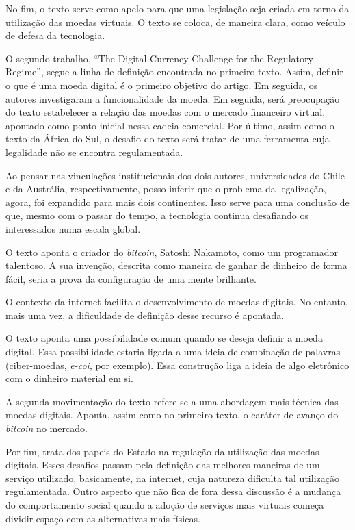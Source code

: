 \documentclass[12pt]{article}
\begin{document}
No fim, o texto serve como apelo para que uma legislação seja criada em torno da utilização das moedas virtuais. O texto se coloca, de maneira clara, como veículo de defesa da tecnologia.

O segundo trabalho, “The Digital Currency Challenge for the Regulatory Regime”, segue a linha de definição encontrada no primeiro texto. Assim, definir o que é uma moeda digital é o primeiro objetivo do artigo. Em seguida, os autores investigaram a funcionalidade da moeda. Em seguida, será preocupação do texto estabelecer a relação das moedas com o mercado financeiro virtual, apontado como ponto inicial nessa cadeia comercial. Por último, assim como o texto da África do Sul, o desafio do texto será tratar de uma ferramenta cuja legalidade não se encontra regulamentada.

Ao pensar nas vinculações institucionais dos dois autores, universidades do Chile e da Austrália, respectivamente, posso inferir que o problema da legalização, agora, foi expandido para mais dois continentes. Isso serve para uma conclusão de que, mesmo com o passar do tempo, a tecnologia continua desafiando os interessados numa escala global.

O texto aponta o criador do \textit{bitcoin}, Satoshi Nakamoto, como um programador talentoso. A sua invenção, descrita como maneira de ganhar de dinheiro de forma fácil, seria a prova da configuração de uma mente brilhante.

O contexto da internet facilita o desenvolvimento de moedas digitais. No entanto, mais uma vez, a dificuldade de definição desse recurso é apontada.

O texto aponta uma possibilidade comum quando se deseja definir a moeda digital. Essa possibilidade estaria ligada a uma ideia  de combinação de palavras (ciber-moedas, \textit{e-coi}, por exemplo). Essa construção liga a ideia de algo eletrônico com o dinheiro material em si. 

A segunda movimentação do texto refere-se a uma abordagem mais técnica das moedas digitais. Aponta, assim como no primeiro texto, o caráter de avanço do \textit{bitcoin} no mercado.

Por fim, trata dos papeis do Estado na regulação da utilização das moedas digitais. Esses desafios passam pela definição das melhores maneiras de um serviço utilizado, basicamente, na internet, cuja natureza dificulta tal utilização regulamentada. Outro aspecto que não fica de fora dessa discussão é a mudança do comportamento social quando a adoção de serviços mais virtuais começa dividir espaço com as alternativas mais físicas.
\end{document}
